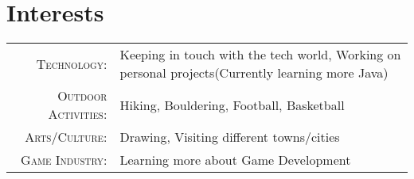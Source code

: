 %
%
%

\section{\texorpdfstring{\color{Blue}Interests}{Interests}}
\begin{tabular}{rl}
    \textsc{Technology:}         & Keeping in touch with the tech world, Working on personal projects(Currently learning more Java) \\
    \textsc{Outdoor Activities:} & Hiking, Bouldering, Football, Basketball                                                                                     \\
    \textsc{Arts/Culture:}               & Drawing, Visiting different towns/cities                                                                        \\
    \textsc{Game Industry:} & Learning more about Game Development
\end{tabular}